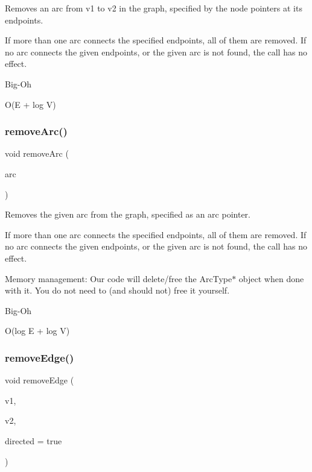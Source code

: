Removes an arc from v1 to v2 in the graph, specified by the node pointers at its endpoints. 

If more than one arc connects the specified endpoints, all of them are removed. If no arc connects the given endpoints, or the given arc is not found, the call has no effect. \begin{DoxyRefDesc}{Big-\/\+Oh}
\item[\mbox{\hyperlink{BigOh__BigOh000085}{Big-\/\+Oh}}]O(E + log V) \end{DoxyRefDesc}
\mbox{\label{classGraph_a9d6580d1b0228fe6c1a02dfe70de1abf}} 
\subsubsection{\texorpdfstring{remove\+Arc()}{removeArc()}\hspace{0.1cm}{\footnotesize\ttfamily [3/3]}}
{\footnotesize\ttfamily void remove\+Arc (\begin{DoxyParamCaption}\item[{Edge\+Gen$<$ V, E $>$  $\ast$}]{arc }\end{DoxyParamCaption})\hspace{0.3cm}{\ttfamily [inherited]}}



Removes the given arc from the graph, specified as an arc pointer. 

If more than one arc connects the specified endpoints, all of them are removed. If no arc connects the given endpoints, or the given arc is not found, the call has no effect.

Memory management\+: Our code will delete/free the Arc\+Type$\ast$ object when done with it. You do not need to (and should not) free it yourself. \begin{DoxyRefDesc}{Big-\/\+Oh}
\item[\mbox{\hyperlink{BigOh__BigOh000086}{Big-\/\+Oh}}]O(log E + log V) \end{DoxyRefDesc}
\mbox{\label{classBasicGraphGen_adfee7a20d0c13cc515b3b7e951d8baf2}} 
\subsubsection{\texorpdfstring{remove\+Edge()}{removeEdge()}\hspace{0.1cm}{\footnotesize\ttfamily [1/3]}}
{\footnotesize\ttfamily void remove\+Edge (\begin{DoxyParamCaption}\item[{const std\+::string \&}]{v1,  }\item[{const std\+::string \&}]{v2,  }\item[{bool}]{directed = {\ttfamily true} }\end{DoxyParamCaption})}



